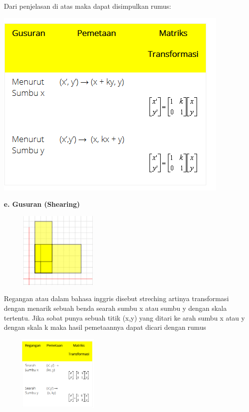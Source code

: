 \documentclass[11pt,fleqn]{book} %
\begin{document}
\noindent
Dari penjelasan di atas maka dapat disimpulkan rumus:
\noindent
\begin{center}
\includegraphics{Pictures/15.PNG}\\
\end{center}
\noindent \textbf{e. Gusuran (Shearing)}
\noindent
\begin{center}
	\noindent \includegraphics*[width=2.32in, height=1.48in, keepaspectratio=false, trim=0.00in 0.11in 0.00in 0.00in]{Pictures/16.PNG}
\end{center}

\noindent
Regangan atau dalam bahasa inggris disebut streching  artinya transformasi dengan menarik sebuah benda searah sumbu x atau sumbu y dengan skala tertentu. Jika sobat punya sebuah titik (x,y) yang ditari ke arah sumbu x atau y dengan skala k maka hasil pemetaannya dapat dicari dengan rumus
\noindent
\begin{center}
	\noindent \includegraphics*[width=2.32in, height=1.48in, keepaspectratio=false, trim=0.00in 0.11in 0.00in 0.00in]{Pictures/17.PNG}
\end{center}
\end{document}
